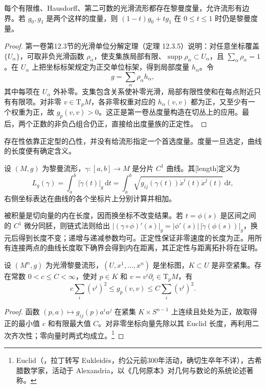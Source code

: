 \begin{proposition}
	\label{g3:prop:metric-existence}
	每个有限维、Hausdorff、第二可数的光滑流形都存在黎曼度量，允许流形有边界。若 \(g_0,g_1\) 是两个这样的度量，则 \((1-t)g_0+tg_1\) 在 \(0\leq t\leq1\) 时仍是黎曼度量。
\end{proposition}
\begin{proof}
	第一卷第12.3节的光滑单位分解定理（定理 12.3.5）说明：对任意坐标覆盖 \(\{U_\alpha\}\)，可取非负光滑函数 \(\rho_\alpha\)，使支集族局部有限、\(\operatorname{supp}\rho_\alpha\subset U_\alpha\)，且 \(\sum_\alpha\rho_\alpha=1\)。在 \(U_\alpha\) 上把坐标标架规定为正交单位标架，得到局部度量 \(h_\alpha\)。令
	\[
		g=\sum_\alpha\rho_\alpha h_\alpha,
	\]
	其中每项在 \(U_\alpha\) 外补零。支集包含关系使补零光滑，局部有限性使和在每点附近只有有限项。对非零 \(v\in\mathrm{T}_pM\)，各非零权重对应的 \(h_\alpha(v,v)\) 都为正，又至少有一个权重为正，故 \(g_p(v,v)>0\)。这正是第一卷丛度量构造在切丛上的应用。最后，两个正数的非负凸组合仍正，直接给出度量族的正定性。
\end{proof}

存在性依靠正定型的凸性，并没有给流形指定一个首选度量。度量一旦选定，曲线的长度便有确定含义。

\begin{definition}
	\label{g3:def:riemannian-length}
	设 \((M,g)\) 为黎曼流形，\(\gamma:[a,b]\to M\) 是分片 \(C^1\) 曲线。其[length]定义为
	\[
		L_g(\gamma)=\int_a^b|\dot\gamma(t)|_g\,\mathrm{d}t
		=\int_a^b\sqrt{g_{ij}(\gamma(t))\dot x^i(t)\dot x^j(t)}\,\mathrm{d}t,
	\]
	右侧坐标表达在曲线的各个坐标片上分别计算并相加。
\end{definition}

被积量是切向量的内在长度，因而换坐标不改变结果。若 \(t=\phi(s)\) 是区间之间的 \(C^1\) 微分同胚，则链式法则给出 \(|(\gamma\circ\phi)'(s)|_g=|\phi'(s)|\,|\dot\gamma(\phi(s))|_g\)，换元后得到长度不变；递增与递减参数均可。正定性保证非零速度的长度为正。用所有连接两点的曲线长度取下确界会得到内在距离，其正定性与距离拓扑将在证明。

\begin{proposition}
	\label{g3:prop:metric-coordinate-bounds}
	设 \((M^n,g)\) 为光滑黎曼流形，\((U,x^1,\ldots,x^n)\) 是坐标图，\(K\subset U\) 是非空紧集。存在常数 \(0<c\leq C<\infty\)，使对 \(p\in K\) 和 \(v=v^i\partial_i\in\mathrm{T}_pM\)，有
	\[
		c\sum_i(v^i)^2\leq g_p(v,v)\leq C\sum_i(v^i)^2.
	\]
\end{proposition}
\begin{proof}
	函数 \((p,a)\mapsto g_{ij}(p)a^ia^j\) 在紧集 \(K\times S^{n-1}\) 上连续且处处为正，故取得正的最小值 \(c\) 和有限最大值 \(C\)。对非零坐标向量先除以其 Euclid 长度，再利用二次齐次性；零向量时两式均成立。\footnote{Euclid（，拉丁转写 Eukleidēs，约公元前300年活动，确切生卒年不详），古希腊数学家，活动于 Alexandria，以《几何原本》对几何与数论的系统论述著称。}
\end{proof}

